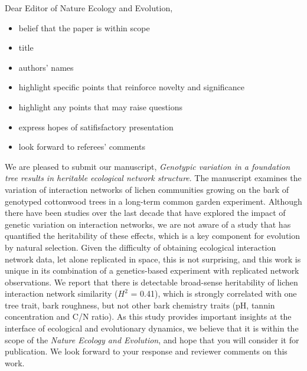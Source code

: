 \documentclass[12pt, a4paper]{letter} %
\begin{document}

\begin{letter}{

}


\opening{Dear Editor of Nature Ecology and Evolution,}

\begin{itemize}
\item belief that the paper is within scope
\item title
\item authors' names
\item highlight specific points that reinforce novelty and
  significance
\item highlight any points that may raise questions
\item express hopes of satifisfactory presentation
\item look forward to referees' comments
\end{itemize}

We are pleased to submit our manuscript, \textit{Genotypic variation
  in a foundation tree results in heritable ecological network
  structure}. The manuscript examines the variation of interaction
networks of lichen communities growing on the bark of genotyped
cottonwood trees in a long-term common garden experiment. Although
there have been studies over the last decade that have explored the
impact of genetic variation on interaction networks, we are not aware
of a study that has quantified the heritability of these effects,
which is a key component for evolution by natural selection. Given the
difficulty of obtaining ecological interaction network data, let alone
replicated in space, this is not surprising, and this work is unique
in its combination of a genetics-based experiment with replicated
network observations. We report that there is detectable broad-sense
heritability of lichen interaction network similarity ($H^2$ = 0.41),
which is strongly correlated with one tree trait, bark roughness, but
not other bark chemistry traits (pH, tannin concentration and C/N
ratio). As this study provides important insights at the interface of
ecological and evolutionary dynamics, we believe that it is within the
scope of the \textit{Nature Ecology and Evolution}, and hope that you
will consider it for publication. We look forward to your response and
reviewer comments on this work. 



\end{letter}
\end{document}
